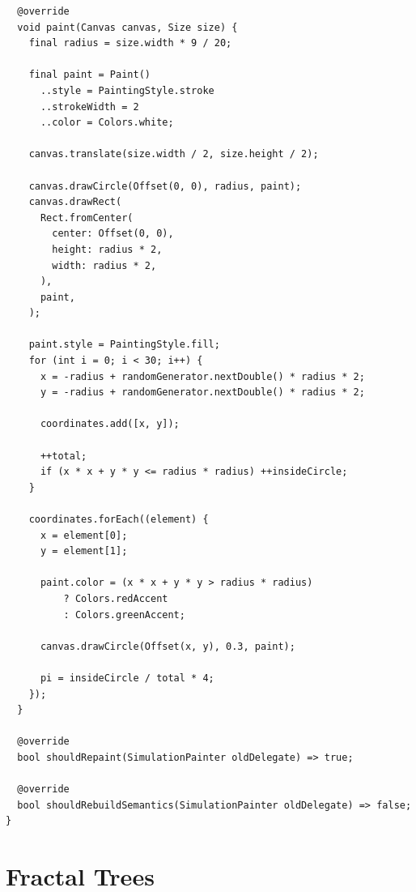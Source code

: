 \documentclass{resonance}
\begin{document}
\begin{verbatim}
  @override
  void paint(Canvas canvas, Size size) {
    final radius = size.width * 9 / 20;

    final paint = Paint()
      ..style = PaintingStyle.stroke
      ..strokeWidth = 2
      ..color = Colors.white;

    canvas.translate(size.width / 2, size.height / 2);

    canvas.drawCircle(Offset(0, 0), radius, paint);
    canvas.drawRect(
      Rect.fromCenter(
        center: Offset(0, 0),
        height: radius * 2,
        width: radius * 2,
      ),
      paint,
    );

    paint.style = PaintingStyle.fill;
    for (int i = 0; i < 30; i++) {
      x = -radius + randomGenerator.nextDouble() * radius * 2;
      y = -radius + randomGenerator.nextDouble() * radius * 2;

      coordinates.add([x, y]);

      ++total;
      if (x * x + y * y <= radius * radius) ++insideCircle;
    }

    coordinates.forEach((element) {
      x = element[0];
      y = element[1];

      paint.color = (x * x + y * y > radius * radius)
          ? Colors.redAccent
          : Colors.greenAccent;

      canvas.drawCircle(Offset(x, y), 0.3, paint);

      pi = insideCircle / total * 4;
    });
  }

  @override
  bool shouldRepaint(SimulationPainter oldDelegate) => true;

  @override
  bool shouldRebuildSemantics(SimulationPainter oldDelegate) => false;
}
\end{verbatim}

\section{Fractal Trees}
\end{document}
